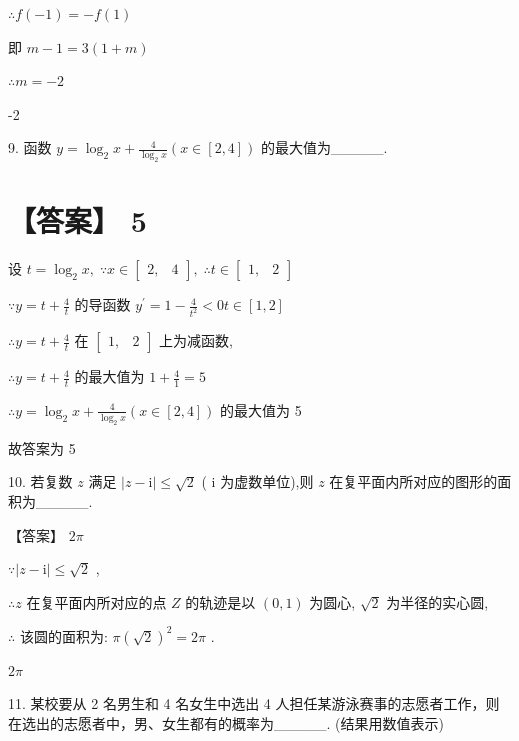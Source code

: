 \documentclass[10pt]{article}
\begin{document}
\(\therefore f\left( {-1}\right)  =  - f\left( 1\right)\)

即 \(m - 1 = 3\left( {1 + m}\right)\)

\(\therefore m =  - 2\)

-2

9. 函数 \(y = {\log }_{2}x + \frac{4}{{\log }_{2}x}\left( {x \in  \left\lbrack  {2,4}\right\rbrack  }\right)\) 的最大值为\_\_\_\_\_.

\section*{【答案】 5}

设 \(t = {\log }_{2}x,\;\because x \in  \left\lbrack  \begin{array}{ll} 2, & 4 \end{array}\right\rbrack  ,\;\therefore t \in  \left\lbrack  \begin{array}{ll} 1, & 2 \end{array}\right\rbrack\)

\(\because y = t + \frac{4}{t}\) 的导函数 \({y}^{\prime } = 1 - \frac{4}{{t}^{2}} < {0t} \in  \left\lbrack  {1,2}\right\rbrack\)

\(\therefore y = t + \frac{4}{t}\) 在 \(\left\lbrack  \begin{array}{ll} 1, & 2 \end{array}\right\rbrack\) 上为减函数,

\(\therefore y = t + \frac{4}{t}\) 的最大值为 \(1 + \frac{4}{1} = 5\)

\(\therefore y = {\log }_{2}x + \frac{4}{{\log }_{2}x}\left( {x \in  \left\lbrack  {2,4}\right\rbrack  }\right)\) 的最大值为 5

故答案为 5

10. 若复数 \(z\) 满足 \(\left| {z - \mathrm{i}}\right|  \leq  \sqrt{2}\) ( \(\mathrm{i}\) 为虚数单位),则 \(z\) 在复平面内所对应的图形的面积为\_\_\_\_\_.

【答案】 \({2\pi }\)

\(\because \left| {z - \mathrm{i}}\right|  \leq  \sqrt{2}\) ,

\(\therefore z\) 在复平面内所对应的点 \(Z\) 的轨迹是以 \(\left( {0,1}\right)\) 为圆心, \(\sqrt{2}\) 为半径的实心圆,

\(\therefore\) 该圆的面积为: \(\pi {\left( \sqrt{2}\right) }^{2} = {2\pi }\) .

\({2\pi }\)

11. 某校要从 2 名男生和 4 名女生中选出 4 人担任某游泳赛事的志愿者工作，则在选出的志愿者中，男、女生都有的概率为\_\_\_\_\_. (结果用数值表示)
\end{document}
